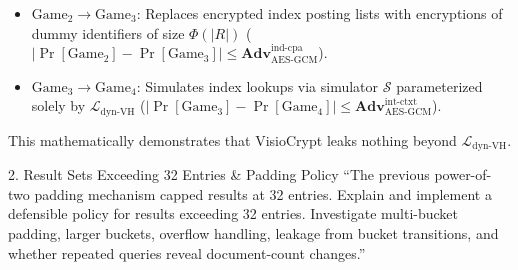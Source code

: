 \documentclass[11pt,a4paper]{article}
\begin{document}
\begin{responsebox}
\begin{itemize}[itemsep=2pt]
\begin{itemize}[itemsep=1pt]
        \item $\text{Game}_2 \to \text{Game}_3$: Replaces encrypted index posting lists with encryptions of dummy identifiers of size $\Phi(|R|)$ ($|\Pr[\text{Game}_2] - \Pr[\text{Game}_3]| \le \mathbf{Adv}_{\text{AES-GCM}}^{\text{ind-cpa}}$).
        \item $\text{Game}_3 \to \text{Game}_4$: Simulates index lookups via simulator $\mathcal{S}$ parameterized solely by $\mathcal{L}_{\text{dyn-VH}}$ ($|\Pr[\text{Game}_3] - \Pr[\text{Game}_4]| \le \mathbf{Adv}_{\text{AES-GCM}}^{\text{int-ctxt}}$).
    \end{itemize}
    This mathematically demonstrates that VisioCrypt leaks nothing beyond $\mathcal{L}_{\text{dyn-VH}}$.
\end{itemize}
\end{responsebox}

\vspace{1em}

\begin{reviewbox}{2. Result Sets Exceeding 32 Entries \& Padding Policy}
``The previous power-of-two padding mechanism capped results at 32 entries. Explain and implement a defensible policy for results exceeding 32 entries. Investigate multi-bucket padding, larger buckets, overflow handling, leakage from bucket transitions, and whether repeated queries reveal document-count changes.''
\end{reviewbox}
\end{document}
